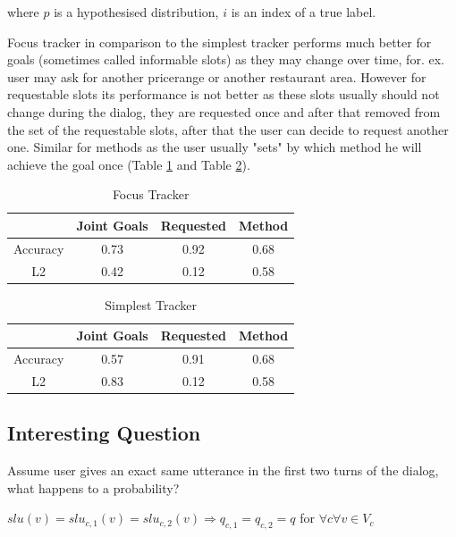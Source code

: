 \documentclass[12pt,titlepage,a4paper]{article}
\begin{document}
\noindent
where $p$ is a hypothesised distribution, $i$ is an index of a true label. 

Focus tracker in comparison to the simplest tracker performs much better for goals (sometimes called informable slots) as they may change over time, for. ex. user may ask for another pricerange or another restaurant area. However for requestable slots its performance is not better as these slots usually should not change during the dialog, they are requested once and after that removed from the set of the requestable slots, after that the user can decide to request another one. Similar for methods as the user usually "sets" by which method he will achieve the goal once (Table \ref{focus_tracker_results} and Table \ref{baseline_tracker_results}).

\begin{table}[ht]
    \centering
    \begin{tabular}{|c c c c|}
    \hline
                & Joint Goals & Requested & Method \\
    \hline
    Accuracy   & 0.73        & 0.92      & 0.68 \\ 
    L2         & 0.42        & 0.12      & 0.58 \\
    \hline
    \end{tabular}
    \caption{Focus Tracker}
    \label{focus_tracker_results}
\end{table}
\begin{table}[ht]
    \centering
    \begin{tabular}{|c c c c|}
    \hline
                & Joint Goals   & Requested & Method \\ 
    \hline
    Accuracy   & 0.57          & 0.91      & 0.68 \\ 
    L2         & 0.83          & 0.12      & 0.58  \\
    \hline
    \end{tabular}
    \caption{Simplest Tracker}
    \label{baseline_tracker_results}
\end{table}

\subsection{Interesting Question}
Assume user gives an exact same utterance in the first two turns of the dialog, what happens to a probability?

$slu(v) = slu_{c, 1}(v) = slu_{c,2}(v) \Rightarrow q_{c,1} = q_{c, 2} = q$ for $\forall c \forall v \in V_c $
\end{document}
